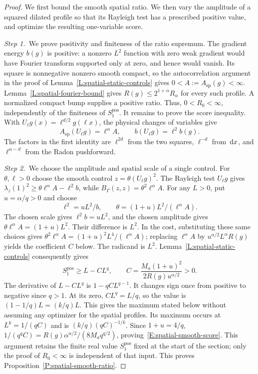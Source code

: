 \begin{proof}
  We first bound the smooth spatial ratio. We then vary the amplitude of a
  squared dilated profile so that its Rayleigh test has a prescribed positive
  value, and optimize the resulting one-variable score.


  \medskip
  \noindent\textit{Step 1.~}We prove positivity and finiteness of the ratio
  supremum.
  The gradient energy $b(g)$ is positive: a nonzero $L^2$ function with zero
  weak gradient would have Fourier transform supported only at zero, and hence
  would vanish. Its square is nonnegative nonzero smooth compact, so the
  autocorrelation argument in the proof of
  Lemma~\ref{L:spatial-static-controls} gives
  $0 < A:=A_{\mathrm{sp}}(g)<\infty$. Lemma~\ref{L:spatial-fourier-bound} gives
  $R(g)\le2^{1+\alpha}R_\alpha$ for every such profile. A normalized compact
  bump supplies a positive ratio. Thus, $0<R_0<\infty$, independently of the
  finiteness of $S_1^{\mathrm{pos}}$. It remains to prove the score inequality.
  With $U_\ell g(x)=\ell^{d/2}g(\ell x)$, the physical changes of variables give
  \begin{equation}\label{E:spatial-dilation}
    A_{\mathrm{sp}}(U_\ell g)=\ell^\alpha A,\qquad
    b(U_\ell g)=\ell^2b(g).
  \end{equation}
  The factors in the first identity are $\ell^{2d}$ from the two squares,
  $\ell^{-d}$ from $\,\mathrm{d} x$, and $\ell^{\alpha-d}$ from the Radon pushforward.


  \medskip
  \noindent\textit{Step 2.~}We choose the amplitude and spatial scale of a
  single control.
  For $\theta,\ell > 0$ choose the smooth control $z = \theta(U_\ell g)^2$. The
  Rayleigh test $U_\ell g$ gives $\lambda_z(1)^2 \ge \theta\ell^\alpha
  A-\ell^2b$, while $B_\Gamma(z,z) = \theta^2\ell^\alpha A$. For any $L > 0$,
  put $u = \alpha/q > 0$ and choose
  \[
    \ell^2=uL^2/b,\qquad
    \theta=(1+u)L^2/(\ell^\alpha A).
  \]
  The chosen scale gives $\ell^2b=uL^2$, and the chosen amplitude gives
  $\theta\ell^\alpha A=(1+u)L^2$. Their difference is $L^2$. In the cost,
  substituting these same choices gives $\theta^2\ell^\alpha
  A=(1+u)^2L^4/(\ell^\alpha A)$; replacing $\ell^\alpha A$ by
  $u^{\alpha/2}L^\alpha R(g)$ yields the coefficient $C$ below.
  The radicand is $L^2$. Lemma~\ref{L:spatial-static-controls} consequently
  gives
  \[
    S_1^{\mathrm{pos}}\ge L-CL^q,\qquad
    C=\frac{M_a(1+u)^2}{2R(g)u^{\alpha/2}}>0.
  \]
  The derivative of $L-CL^q$ is $1-qCL^{q-1}$. It changes sign once from
  positive to negative since $q>1$. At its zero, $CL^q=L/q$, so the value is
  $(1-1/q)L=(k/q)L$. This gives the maximum stated below without assuming any
  optimizer for the spatial profiles.
  Its maximum occurs at $L^k = 1/(qC)$ and is $(k/q)(qC)^{-1/k}$. Since $1+u =
  4/q$, $1/(q^qC) = R(g)\alpha^{\alpha/2}/(8M_aq^{q/2})$,
  proving~\eqref{E:spatial-smooth-score}. This argument retains the finite
  real value $S_1^{\mathrm{pos}}$ fixed at the start of the section; only the
  proof of $R_0<\infty$ is independent of that input. This proves
  Proposition~\ref{P:spatial-smooth-ratio}.
\end{proof}


